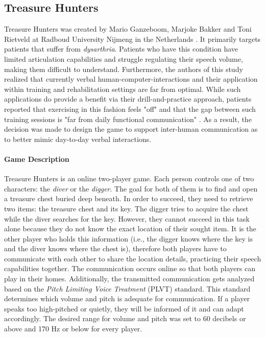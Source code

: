 \documentclass[draft,final]{vutinfth} %
\begin{document}
\subsection{Treasure Hunters}
Treasure Hunters was created by Mario Ganzeboom, Marjoke Bakker and Toni Rietveld at Radboud University Nijmeng in the Netherlands \cite{TreasureHunters}. It primarily targets patients that suffer from \emph{dysarthria}. Patients who have this condition have limited articulation capabilities and struggle regulating their speech volume, making them difficult to understand. Furthermore, the authors of this study realized that currently verbal human-computer-interactions and their application within training and rehabilitation settings are far from optimal. While such applications do provide a benefit via their drill-and-practice approach, patients reported that exercising in this fashion feels "off" and that the gap between such training sessions is "far from daily functional communication" \cite{TreasureHunters}. As a result, the decision was made to design the game to support inter-human communication as to better mimic day-to-day verbal interactions.

\paragraph{Game Description} Treasure Hunters is an online two-player game. Each person controls one of two characters: the \emph{diver} or the \emph{digger}. The goal for both of them is to find and open a treasure chest buried deep beneath. In order to succeed, they need to retrieve two items: the treasure chest and its key. The digger tries to acquire the chest while the diver searches for the key. However, they cannot succeed in this task alone because they do not know the exact location of their sought item. It is the other player who holds this information (i.e., the digger knows where the key is and the diver knows where the chest is), therefore both players have to communicate with each other to share the location details, practicing their speech capabilities together.
The communication occurs online so that both players can play in their homes. Additionally, the transmitted communication gets analyzed based on the \emph{Pitch Limiting Voice Treatment} (PLVT) \cite{de2003improvement} standard. This standard determines which volume and pitch is adequate for communication. If a player speaks too high-pitched or quietly, they will be informed of it and can adapt accordingly. The desired range for volume and pitch was set to 60 decibels or above and 170 Hz or below for every player.
\end{document}
